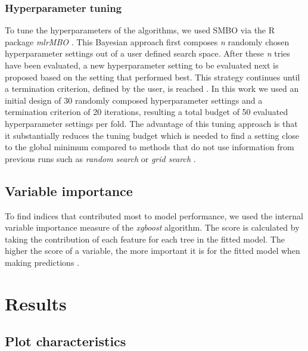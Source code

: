 \documentclass[review]{elsarticle}
\begin{document}

\subsubsection{Hyperparameter tuning}
To tune the hyperparameters of the algorithms, we used \ac{SMBO} via the R package \textit{mlrMBO} \citep{mlrMBO}.
This Bayesian approach first composes \textit{n} randomly chosen hyperparameter settings out of a user defined search space.
After these \textit{n} tries have been evaluated, a new hyperparameter setting to be evaluated next is proposed based on the setting that performed best.
This strategy continues until a termination criterion, defined by the user, is reached \citep{Hutter2011, Jones1998}.
In this work we used an initial design of 30 randomly composed hyperparameter settings and a termination criterion of 20 iterations, resulting a total budget of 50 evaluated hyperparameter settings per fold.
The advantage of this tuning approach is that it substantially reduces the tuning budget which is needed to find a setting close to the global minimum compared to methods that do not use information from previous runs such as \textit{random search} or \textit{grid search} \citep{Bergstra2012}.

\subsection{Variable importance}

To find indices that contributed most to model performance, we used the internal variable importance measure of the \textit{xgboost} algorithm.
The score is calculated by taking the contribution of each feature for each tree in the fitted model.
The higher the score of a variable, the more important it is for the fitted model when making predictions \citep{chenXGBoostScalableTree2016}.


\section{Results}

\subsection{Plot characteristics}
\end{document}
